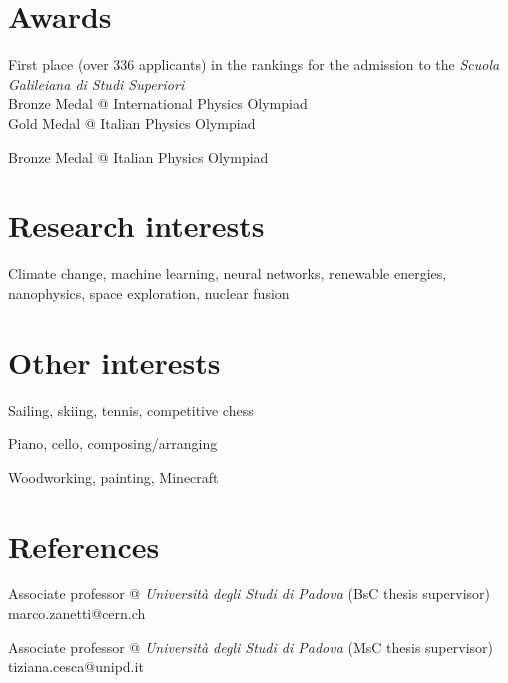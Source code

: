 \documentclass[11pt, a4 paper]{article}
\begin{document}
\section*{Awards}
  \begin{description}[style=multiline,leftmargin=3cm,align=right]
    \item[2016]
      First place (over 336 applicants) in the rankings for the admission to the \emph{Scuola Galileiana di Studi Superiori} \\
      Bronze Medal @ International Physics Olympiad \\
      Gold Medal @ Italian Physics Olympiad
    \item[2015] Bronze Medal @ Italian Physics Olympiad
  \end{description}


\section*{Research interests}
  \begin{description}[style=multiline,leftmargin=3cm,align=right]
    \item[] Climate change, machine learning, neural networks, renewable energies, nanophysics, space exploration, nuclear fusion
  \end{description}


\section*{Other interests}
  \begin{description}[style=multiline,leftmargin=3cm,align=right]
    \item[Sports] Sailing, skiing, tennis, competitive chess
    \item[Music] Piano, cello, composing/arranging
    \item[Other] Woodworking, painting, Minecraft
  \end{description}


\section*{References}
\begin{description}[style=multiline,leftmargin=3cm,align=right]
  \item[Marco Zanetti]
    Associate professor @ \emph{Università degli Studi di Padova} (BsC thesis supervisor) \\
    marco.zanetti@cern.ch
  \item[Tiziana Cesca]
    Associate professor @ \emph{Università degli Studi di Padova} (MsC thesis supervisor) \\
    tiziana.cesca@unipd.it


\end{description}
\end{document}
